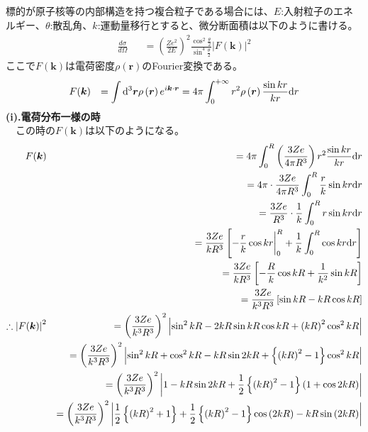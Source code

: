 \documentclass[a4j,fleqn]{jsarticle}
\begin{document}
        \subsection{}
        標的が原子核等の内部構造を持つ複合粒子である場合には、$E$:入射粒子のエネルギー、$\theta$:散乱角、$k$:運動量移行とすると、微分断面積は以下のように書ける。
        \begin{eqnarray}
            \frac{d\sigma}{d\Omega}&&=\left(\frac{Ze^2}{2E}\right)^2\frac{\cos^2{\frac{\theta}{2}}}{\sin^4{\frac{\theta}{2}}}\left|F(\bm{k})\right|^2
        \end{eqnarray}
        ここで$F(\bm{k})$は電荷密度$\rho\left(\bm{r}\right)$のFourier変換である。
        \begin{eqnarray}
            F(\bm{k})&&=\int{{\rm{d}}^3\bm{r}{\rho\left(\bm{r}\right)e^{i\bm{k}\cdot\bm{r}}}}=4\pi\int_{0}^{+\infty}{r^2\rho\left(\bm{r}\right)\frac{\sin{kr}}{kr}{\rm{d}}r}
        \end{eqnarray}
        \textbf{(i).電荷分布一様の時}\\
        　この時の$F(\bm{k})$は以下のようになる。
        \begin{eqnarray}
            F(\bm{k})&&=4\pi\int_{0}^{R}{\left(\frac{3Ze}{4\pi{R^3}}\right)r^2\frac{\sin{kr}}{kr}{\rm{d}}r}\\
            \nonumber&&=4\pi\cdot\frac{3Ze}{4\pi{R^3}}\int_{0}^{R}{\frac{r}{k}\sin{kr}{\rm{d}}r}\\
            \nonumber&&=\frac{3Ze}{R^3}\cdot\frac{1}{k}\int_{0}^{R}{r\sin{kr}{\rm{d}}r}\\
            \nonumber&&=\frac{3Ze}{kR^3}\left[-\frac{r}{k}\cos{kr}\bigg|_{0}^{R}+\frac{1}{k}\int_{0}^{R}{\cos{kr}{\rm{d}}r}\right]\\
            \nonumber&&=\frac{3Ze}{kR^3}\left[-\frac{R}{k}\cos{kR}+\frac{1}{k^2}\sin{kR}\right]\\
            \nonumber&&=\frac{3Ze}{k^3R^3}\left[\sin{kR}-{kR}\cos{kR}\right]\\
            \nonumber\therefore\left|F(\bm{k})\right|^2&&=\left(\frac{3Ze}{k^3R^3}\right)^2\left|\sin^2{kR}-2{kR}\sin{kR}\cos{kR}+\left(kR\right)^2\cos^2{kR}\right|\\
            \nonumber&&=\left(\frac{3Ze}{k^3R^3}\right)^2\left|\sin^2{kR}+\cos^2{kR}-{kR}\sin{2kR}+\left\{\left(kR\right)^2-1\right\}\cos^2{kR}\right|\\
            \nonumber&&=\left(\frac{3Ze}{k^3R^3}\right)^2\left|1-{kR}\sin{2kR}+\frac{1}{2}\left\{\left(kR\right)^2-1\right\}\left(1+\cos{2kR}\right)\right|\\
            \nonumber&&=\left(\frac{3Ze}{k^3R^3}\right)^2\left|\frac{1}{2}\left\{\left(kR\right)^2+1\right\}+\frac{1}{2}\left\{\left(kR\right)^2-1\right\}\cos{\left(2kR\right)}-{kR}\sin{\left(2kR\right)}\right|
        \end{eqnarray}
\end{document}

